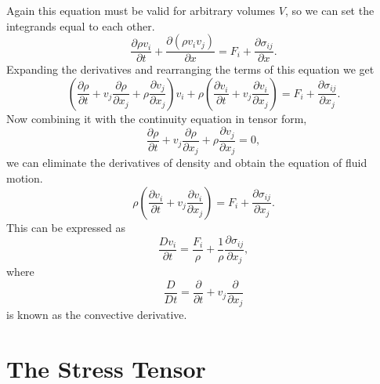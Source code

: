 \documentclass[12pt, letter]{report}
\begin{document}
Again this equation must be valid for arbitrary volumes $V$, so we can set the integrands equal to each other.
\begin{equation}
\frac{\partial \rho v_i}{\partial t} + \frac{\partial (\rho v_i v_j)}{\partial x} = F_i + \frac{\partial \sigma_{ij}}{\partial x}.
\end{equation}
Expanding the derivatives and rearranging the terms of this equation we get
\begin{equation}
\left( \frac{\partial \rho}{\partial t} + v_j \frac{\partial \rho}{\partial x_j} + \rho \frac{\partial v_j}{\partial x_j} \right) v_i + \rho \left( \frac{\partial v_i}{\partial t} + v_j \frac{\partial v_i}{\partial x_j} \right) = F_i + \frac{\partial \sigma_{ij}}{\partial x_j}.
\end{equation}
Now combining it with the continuity equation in tensor form,
\begin{equation}
\frac{\partial \rho}{\partial t} + v_j \frac{\partial \rho}{\partial x_j} + \rho \frac{\partial v_j}{\partial x_j} = 0,
\end{equation}
we can eliminate the derivatives of density and obtain the equation of fluid motion.
\begin{equation}
\rho \left( \frac{\partial v_i}{\partial t} + v_j \frac{\partial v_i}{\partial x_j} \right) = F_i + \frac{\partial \sigma_{ij}}{\partial x_j}.
\end{equation}
This can be expressed as
\begin{equation}
\label{eq:momentum_transport}
\frac{D v_i}{\partial t} = \frac{F_i}{\rho} + \frac{1}{\rho}\frac{\partial \sigma_{ij}}{\partial x_j},
\end{equation}
where 
\begin{equation}
\frac{D}{Dt} = \frac{\partial }{\partial t} + v_j \frac{\partial }{\partial x_j}
\end{equation}
is known as the convective derivative. 

\section{The Stress Tensor}
\end{document}
